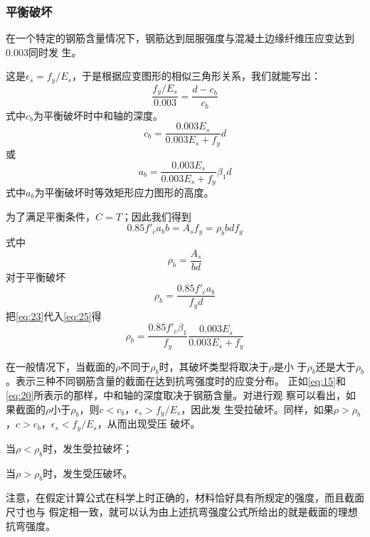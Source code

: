 \documentclass[12pt,a4paper]{book}
\begin{document}
\subsubsection{平衡破坏}

在一个特定的钢筋含量情况下，钢筋达到屈服强度与混凝土边缘纤维压应变达到0.003同时发
生。

这是$\epsilon_s=f_y/E_s$，于是根据应变图形的相似三角形关系，我们就能写出：
\begin{equation*}
  \frac{f_y/E_s}{0.003}=\frac{d-c_b}{c_b}
\end{equation*}
式中$c_b$为平衡破坏时中和轴的深度。
\begin{equation}
  \label{eq:22}
  c_b=\frac{0.003E_s}{0.003E_s+f_y}d
\end{equation}
或
\begin{equation}
  \label{eq:23}
  a_b=\frac{0.003E_s}{0.003E_s+f_y}\beta_1 d
\end{equation}
式中$a_b$为平衡破坏时等效矩形应力图形的高度。

为了满足平衡条件，$C=T$；因此我们得到
\begin{equation*}
  0.85f'_ca_bb=A_sf_y=\rho_bbdf_y
\end{equation*}
式中
\begin{equation*}
  \rho_b=\frac{A_s}{bd}
\end{equation*}
对于平衡破坏
\begin{equation}
  \label{eq:25}
  \rho_b=\frac{0.85f'_ca_b}{f_yd}
\end{equation}
把\cref{eq:23}代入\cref{eq:25}得
\begin{equation}
  \label{eq:26}
  \rho_b=\frac{0.85f'_c\beta_1}{f_y}\frac{0.003E_s}{0.003E_s+f_y}
\end{equation}

在一般情况下，当截面的$\rho$不同于$\rho_b$时，其破坏类型将取决于$\rho$是小
于$\rho_b$还是大于$\rho_b$。表示三种不同钢筋含量的截面在达到抗弯强度时的应变分布。
正如\cref{eq:15}和\cref{eq:20}所表示的那样，中和轴的深度取决于钢筋含量。对进行观
察可以看出，如果截面的$\rho$小于$\rho_b$，则$c<c_b$，$\epsilon_s>f_y/E_s$，因此发
生受拉破坏。同样，如果$\rho>\rho_b$，$c>c_b$，$\epsilon_s<f_y/E_s$，从而出现受压
破坏。

当$\rho<\rho_b$时，发生受拉破坏；

当$\rho>\rho_b$时，发生受压破坏。

注意，在假定计算公式在科学上时正确的，材料恰好具有所规定的强度，而且截面尺寸也与
假定相一致，就可以认为由上述抗弯强度公式所给出的就是截面的理想抗弯强度。
\end{document}
